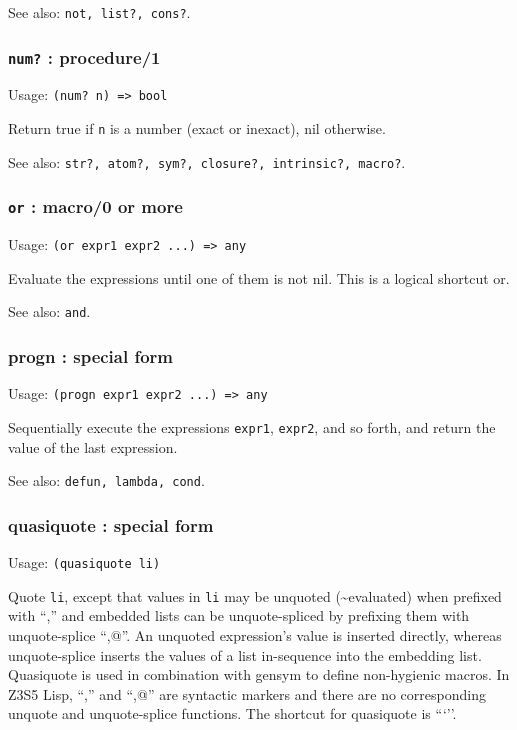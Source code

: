\documentclass[
]{article}
\newcommand{\passthrough}[1]{#1}
\begin{document}
See also: \passthrough{\lstinline!not, list?, cons?!}.

\hypertarget{num-procedure1}{%
\subsubsection{\texorpdfstring{\texttt{num?} :
procedure/1}{num? : procedure/1}}\label{num-procedure1}}

Usage: \passthrough{\lstinline!(num? n) => bool!}

Return true if \passthrough{\lstinline!n!} is a number (exact or
inexact), nil otherwise.

See also:
\passthrough{\lstinline!str?, atom?, sym?, closure?, intrinsic?, macro?!}.

\hypertarget{or-macro0-or-more}{%
\subsubsection{\texorpdfstring{\texttt{or} : macro/0 or
more}{or : macro/0 or more}}\label{or-macro0-or-more}}

Usage: \passthrough{\lstinline!(or expr1 expr2 ...) => any!}

Evaluate the expressions until one of them is not nil. This is a logical
shortcut or.

See also: \passthrough{\lstinline!and!}.

\hypertarget{progn-special-form}{%
\subsubsection{progn : special form}\label{progn-special-form}}

Usage: \passthrough{\lstinline!(progn expr1 expr2 ...) => any!}

Sequentially execute the expressions \passthrough{\lstinline!expr1!},
\passthrough{\lstinline!expr2!}, and so forth, and return the value of
the last expression.

See also: \passthrough{\lstinline!defun, lambda, cond!}.

\hypertarget{quasiquote-special-form}{%
\subsubsection{quasiquote : special
form}\label{quasiquote-special-form}}

Usage: \passthrough{\lstinline!(quasiquote li)!}

Quote \passthrough{\lstinline!li!}, except that values in
\passthrough{\lstinline!li!} may be unquoted (\textasciitilde evaluated)
when prefixed with ``,'' and embedded lists can be unquote-spliced by
prefixing them with unquote-splice ``,@''. An unquoted expression's
value is inserted directly, whereas unquote-splice inserts the values of
a list in-sequence into the embedding list. Quasiquote is used in
combination with gensym to define non-hygienic macros. In Z3S5 Lisp,
``,'' and ``,@'' are syntactic markers and there are no corresponding
unquote and unquote-splice functions. The shortcut for quasiquote is
```''.
\end{document}
